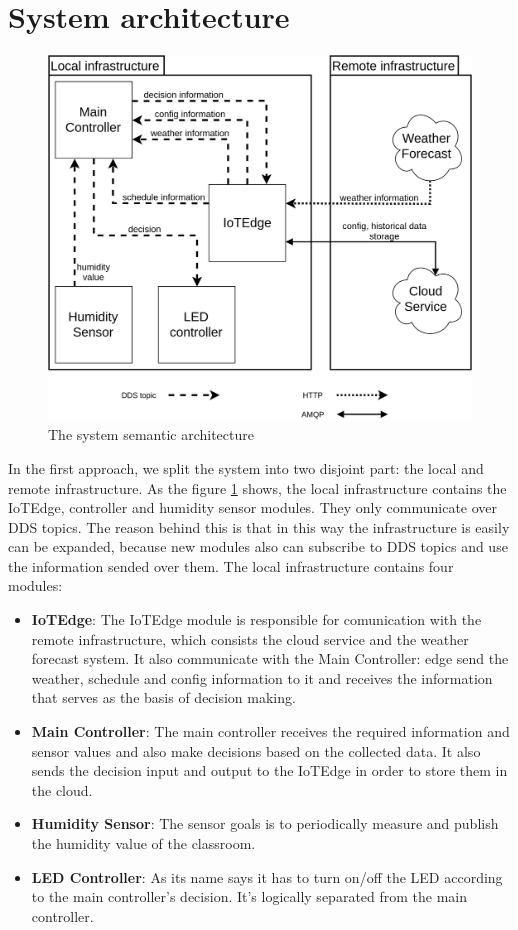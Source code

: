 \documentclass{article}
\begin{document}
\section{System architecture}
\begin{figure}[!htb]
  \includegraphics[width=\linewidth]{imgs/system_architecture.png}
  \caption{The system semantic architecture}
  \label{fig:system_architecture}
\end{figure}
In the first approach, we split the system into two disjoint part: the local and remote infrastructure. As the figure \ref{fig:system_architecture} shows, the local infrastructure contains the IoTEdge, controller and humidity sensor modules. They only communicate over DDS topics. The reason behind this is that in this way the infrastructure is easily can be expanded, because new modules also can subscribe to DDS topics and use the information sended over them. The local infrastructure contains four modules:
\begin{itemize}
\item \textbf{IoTEdge}: The IoTEdge module is responsible for comunication with the remote infrastructure, which consists the cloud service and the weather forecast system. It also communicate with the Main Controller: edge send the weather, schedule and config information to it and receives the information that serves as the basis of decision making.
\item \textbf{Main Controller}: The main controller receives the required information and sensor values and also make decisions based on the collected data. It also sends the decision input and output to the IoTEdge in order to store them in the cloud.
\item \textbf{Humidity Sensor}: The sensor goals is to periodically measure and publish the humidity value of the classroom.
\item \textbf{LED Controller}: As its name says it has to turn on/off the LED according to the main controller's decision. It's logically separated from the main controller.
\end{itemize}
\end{document}
